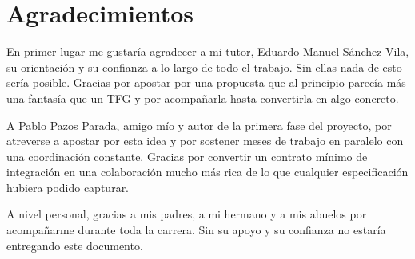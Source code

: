 \pagestyle{plain}
\chapter*{Agradecimientos}

En primer lugar me gustaría agradecer a mi tutor, Eduardo Manuel Sánchez Vila, su orientación y su confianza a lo largo de todo el trabajo. Sin ellas nada de esto sería posible. Gracias por apostar por una propuesta que al principio parecía más una fantasía que un TFG y por acompañarla hasta convertirla en algo concreto.

A Pablo Pazos Parada, amigo mío y autor de la primera fase del proyecto, por atreverse a apostar por esta idea y por sostener meses de trabajo en paralelo con una coordinación constante. Gracias por convertir un contrato mínimo de integración en una colaboración mucho más rica de lo que cualquier especificación hubiera podido capturar.

A nivel personal, gracias a mis padres, a mi hermano y a mis abuelos por acompañarme durante toda la carrera. Sin su apoyo y su confianza no estaría entregando este documento.
